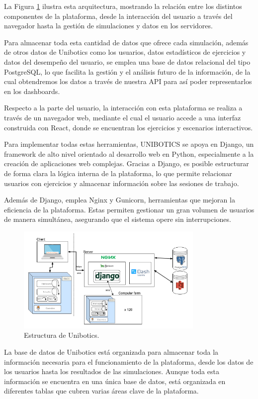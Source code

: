 \documentclass[a4paper, 12pt]{book}
\begin{document}
La Figura \ref{fig:arquitectura} ilustra esta arquitectura, mostrando la relación entre los distintos componentes de la plataforma, desde la interacción del usuario a través del navegador hasta la gestión de simulaciones y datos en los servidores.

Para almacenar toda esta cantidad de datos que ofrece cada simulación, además de otros datos de Unibotics como los usuarios, datos estadísticos de ejercicios y datos del desempeño del usuario, se emplea una base de datos relacional del tipo PostgreSQL, lo que facilita la gestión y el análisis futuro de la información, de la cual obtendremos los datos a través de nuestra API para así poder representarlos en los dashboards.

Respecto a la parte del usuario, la interacción con esta plataforma se realiza a través de un navegador web, mediante el cual el usuario accede a una interfaz construida con React, donde se encuentran los ejercicios y escenarios interactivos.

Para implementar todas estas herramientas, UNIBOTICS se apoya en Django, un framework de alto nivel orientado al desarrollo web en Python, especialmente a la creación de aplicaciones web complejas. Gracias a Django, es posible estructurar de forma clara la lógica interna de la plataforma, lo que permite relacionar usuarios con ejercicios y almacenar información sobre las sesiones de trabajo.

Además de Django, emplea Nginx y Gunicorn, herramientas que mejoran la eficiencia de la plataforma. Estas permiten gestionar un gran volumen de usuarios de manera simultánea, asegurando que el sistema opere sin interrupciones.

\begin{figure}
  \centering
  \includegraphics[width=9cm, keepaspectratio]{img/arquitectura.png}
  \caption{Estructura de Unibotics.}\label{fig:arquitectura}
\end{figure}

La base de datos de Unibotics está organizada para almacenar toda la información necesaria para el funcionamiento de la plataforma, desde los datos de los usuarios hasta los resultados de las simulaciones. Aunque toda esta información se encuentra en una única base de datos, está organizada en diferentes tablas que cubren varias áreas clave de la plataforma.
\end{document}
